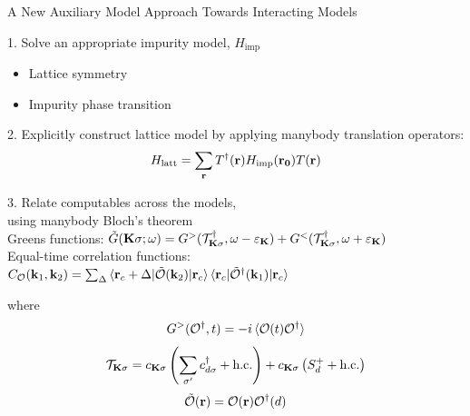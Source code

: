 \documentclass[10pt,aspectratio=169]{beamer}
\begin{document}
\begin{frame}{A New Auxiliary Model Approach Towards Interacting Models}
	\begin{minipage}{0.4\textwidth}
	1. Solve an appropriate impurity model, \(H_\text{imp}\)
	\begin{itemize}
		\item Lattice symmetry
		\item Impurity phase transition
	\end{itemize}
	\end{minipage}
	\hfill
	\begin{minipage}{0.48\textwidth}
	2. Explicitly construct lattice model by applying manybody translation operators:
	\[ H_\text{latt} = \sum_{\bf r} T^\dagger({\bf r}) H_\text{imp}({\bf r_0})T({\bf r})\]
	\end{minipage}

	\vfill
	\begin{minipage}{0.53\textwidth}
	3. Relate computables across the models,\\ using manybody Bloch's theorem\\[5pt]
	Greens functions: 
	\(\tilde G({\bf K}\sigma; \omega) = G^>(\mathcal{T}^\dagger_{{\bf K}\sigma}, \omega - \varepsilon_{{\bf K}}) + G^<(\mathcal{T}^\dagger_{{\bf K}\sigma}, \omega + \varepsilon_{{\bf K}})\)\\[5pt]
	Equal-time correlation functions:\\
	\(C_{\mathcal{O}}({\bf k}_1,{\bf k}_2) = \sum_{{\Delta}}\braket{{\bf r}_c + {\Delta} | \mathcal{\tilde O}({\bf k}_2) | {\bf r}_c}\braket{{\bf r}_c | \mathcal{\tilde O}^\dagger({\bf k}_1) | {\bf r}_c}\)
	\end{minipage}
	\hfill
	\begin{minipage}{0.45\textwidth}
	where 
	\[G^>(\mathcal{O}^\dagger, t) = -i\braket{\mathcal{O}(t)\mathcal{O}^\dagger}\]
	\[\mathcal{T}_{{\bf K}\sigma} = c_{{\bf K}\sigma}\left(\sum_{\sigma^\prime}c^\dagger_{d\sigma} + \text{h.c.}\right) + c_{{\bf K}\sigma}\left(S_d^+ + \text{h.c.}\right)\]
	\[\mathcal{\tilde O}({\bf r}) = \mathcal{O}({\bf r})\mathcal{O}^\dagger(d)\]
	\end{minipage}
	
	
	
\end{frame}
\end{document}
